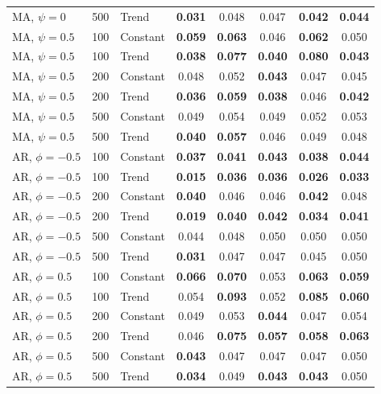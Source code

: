 \begin{tabular}{lrlccccc}
MA, $\psi = 0$ & 500 & Trend & \textbf{0.031} & 0.048 & 0.047 & \textbf{0.042} & \textbf{0.044} \\
\addlinespace
MA, $\psi = 0.5$ & 100 & Constant & \textbf{0.059} & \textbf{0.063} & 0.046 & \textbf{0.062} & 0.050 \\
MA, $\psi = 0.5$ & 100 & Trend & \textbf{0.038} & \textbf{0.077} & \textbf{0.040} & \textbf{0.080} & \textbf{0.043} \\
MA, $\psi = 0.5$ & 200 & Constant & 0.048 & 0.052 & \textbf{0.043} & 0.047 & 0.045 \\
MA, $\psi = 0.5$ & 200 & Trend & \textbf{0.036} & \textbf{0.059} & \textbf{0.038} & 0.046 & \textbf{0.042} \\
MA, $\psi = 0.5$ & 500 & Constant & 0.049 & 0.054 & 0.049 & 0.052 & 0.053 \\
MA, $\psi = 0.5$ & 500 & Trend & \textbf{0.040} & \textbf{0.057} & 0.046 & 0.049 & 0.048 \\
\addlinespace
AR, $\phi = -0.5$ & 100 & Constant & \textbf{0.037} & \textbf{0.041} & \textbf{0.043} & \textbf{0.038} & \textbf{0.044} \\
AR, $\phi = -0.5$ & 100 & Trend & \textbf{0.015} & \textbf{0.036} & \textbf{0.036} & \textbf{0.026} & \textbf{0.033} \\
AR, $\phi = -0.5$ & 200 & Constant & \textbf{0.040} & 0.046 & 0.046 & \textbf{0.042} & 0.048 \\
AR, $\phi = -0.5$ & 200 & Trend & \textbf{0.019} & \textbf{0.040} & \textbf{0.042} & \textbf{0.034} & \textbf{0.041} \\
AR, $\phi = -0.5$ & 500 & Constant & 0.044 & 0.048 & 0.050 & 0.050 & 0.050 \\
AR, $\phi = -0.5$ & 500 & Trend & \textbf{0.031} & 0.047 & 0.047 & 0.045 & 0.050 \\
\addlinespace
AR, $\phi = 0.5$ & 100 & Constant & \textbf{0.066} & \textbf{0.070} & 0.053 & \textbf{0.063} & \textbf{0.059} \\
AR, $\phi = 0.5$ & 100 & Trend & 0.054 & \textbf{0.093} & 0.052 & \textbf{0.085} & \textbf{0.060} \\
AR, $\phi = 0.5$ & 200 & Constant & 0.049 & 0.053 & \textbf{0.044} & 0.047 & 0.054 \\
AR, $\phi = 0.5$ & 200 & Trend & 0.046 & \textbf{0.075} & \textbf{0.057} & \textbf{0.058} & \textbf{0.063} \\
AR, $\phi = 0.5$ & 500 & Constant & \textbf{0.043} & 0.047 & 0.047 & 0.047 & 0.050 \\
AR, $\phi = 0.5$ & 500 & Trend & \textbf{0.034} & 0.049 & \textbf{0.043} & \textbf{0.043} & 0.050 \\
\bottomrule
\end{tabular}

